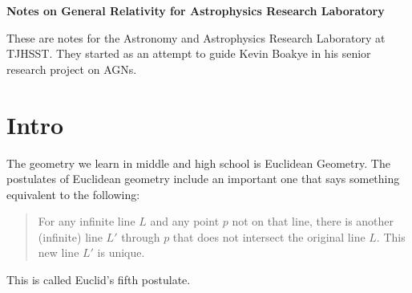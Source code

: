 \usepackage{amsthm} %
\theoremstyle{definition}
\newtheorem{definition}{Definition}
\theoremstyle{plain}
\newtheorem{proposition}{Proposition}
\newtheorem{lemma}{Lemma}
\newtheorem{theorem}{Theorem}
\newtheorem{corollary}{Corollary}
\newtheorem{conjecture}{Conjecture}
\newtheorem{example}{Example}
\newtheorem{result}{Result}
\newtheorem{claim}{Claim}
\newtheorem*{result*}{Result}
\newtheorem{exercise}{Exercise}
\newtheorem{problem}{Problem}




{\center
{\color{violet}\fontsize{28pt}{34pt}\bf\sffamily 
Notes on General Relativity for Astrophysics Research Laboratory
\\[.5in]
}

}
{\abstract
These are notes for the Astronomy and Astrophysics Research Laboratory at TJHSST. They started as an attempt to guide Kevin Boakye in his senior research project on AGNs.
}



{
\linespread{.8}
\small
\tableofcontents
}

\thispagestyle{empty}
\newpage
\section{Intro}

The geometry we learn in middle and high school is Euclidean Geometry. The postulates of Euclidean geometry include an important one that says something equivalent to the following:
\begin{quote}
For any infinite line $L$ and any point $p$ not on that line, there is another (infinite) line $L'$ through $p$ that does not intersect the original line $L$. This new line $L'$ is unique. 
\end{quote}
This is called Euclid's fifth postulate. 

